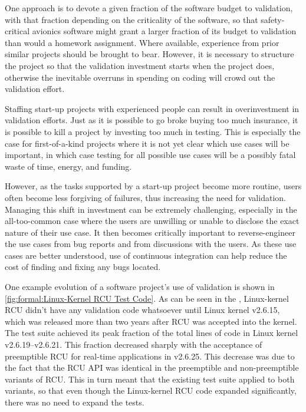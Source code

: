 One approach is to devote a given fraction of the software budget to
validation, with that fraction depending on the criticality of the
software, so that safety-critical avionics software might grant a
larger fraction of its budget to validation than would a homework
assignment.
Where available, experience from prior similar projects should be
brought to bear.
However, it is necessary to structure the project so that the validation
investment starts when the project does, otherwise the inevitable overruns
in spending on coding will crowd out the validation effort.

Staffing start-up projects with experienced people can result in
overinvestment in validation efforts.
Just as it is possible to go broke buying too much insurance, it is
possible to kill a project by investing too much in testing.
This is especially the case for first-of-a-kind projects where it is
not yet clear which use cases will be important, in which case testing
for all possible use cases will be a possibly fatal waste of time,
energy, and funding.

However, as the tasks supported by a start-up project become more routine,
users often become less forgiving of failures, thus increasing the need
for validation.
Managing this shift in investment can be extremely challenging,
especially in the all-too-common case where the users are unwilling
or unable to disclose the exact nature of their use case.
It then becomes critically important to reverse-engineer the
use cases from bug reports and from discussions with the users.
As these use cases are better understood, use of continuous integration
can help reduce the cost of finding and fixing any bugs located.


One example evolution of a software project's use of validation is
shown in
\cref{fig:formal:Linux-Kernel RCU Test Code}.
As can be seen in the ,
Linux-kernel RCU didn't have any validation code whatsoever until Linux
kernel v2.6.15, which was released more than two years after RCU was
accepted into the kernel.
The test suite achieved its peak fraction of the total lines of code
in Linux kernel v2.6.19--v2.6.21.
This fraction decreased sharply with the acceptance of preemptible RCU
for real-time applications in v2.6.25.
This decrease was due to the fact that the RCU API was identical
in the preemptible and non-preemptible variants of RCU\@.
This in turn meant that the existing test suite applied to both variants,
so that even though the Linux-kernel RCU code expanded significantly,
there was no need to expand the tests.

